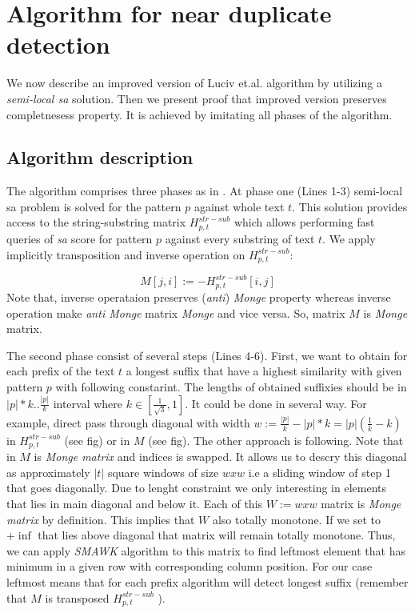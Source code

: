 \section{Algorithm for near duplicate detection}
\label{section:luciv}

We now describe an improved version of Luciv et.al. algorithm \cite{luciv2019interactive} by utilizing a \emph{semi-local sa} solution.
Then we present proof that improved version preserves completnesess property.
It is achieved by imitating all phases of the algorithm. 
 

\subsection{Algorithm description}

The algorithm comprises three phases as in \cite{luciv2019interactive}.
At phase one (Lines 1-3) semi-local sa problem is solved for the pattern $p$ against whole text $t$.
This solution provides access to the string-substring matrix $H^{str-sub}_{p,t}$ which allows performing fast queries of \emph{sa} score for pattern $p$ against every substring of text $t$.
We apply implicitly transposition and inverse operation on $H^{str-sub}_{p,t}$:

\begin{equation}
	M[j,i]:= -H^{str-sub}_{p,t}[i,j]
\end{equation}
Note that, inverse operataion preserves (\emph{anti}) \emph{Monge} property whereas inverse operation make \emph{anti Monge} matrix \emph{Monge} and vice versa. 
So, matrix $M$ is \emph{Monge} matrix.

The second phase consist of several steps (Lines 4-6).
First, we want to obtain for each prefix of the text $t$ a longest suffix that have a highest similarity with given pattern $p$ with following constarint.
The lengths of obtained suffixies should be in $|p|*k..\frac{|p|}{k}$ interval where $k \in [\frac{1}{\sqrt{3}},1]$.
It could be done in several way.
For example, direct pass through diagonal with width $w:= \frac{|p|}{k} - |p|*k = |p|(\frac{1}{k} - k)$ in $H^{str-sub}_{p,t}$ (see fig) or in $M$ (see fig).
The other approach is following.
Note that in  $M$ is \emph{Monge matrix} and  indices is swapped.
It allows us to descry this diagonal as approximately $|t|$ square windows of size $wxw$ i.e a sliding window of step 1 that goes diagonally.
Due to lenght constraint we only interesting in elements that lies in main diagonal and below it.
Each of this $W:=wxw$ matrix is \emph{Monge matrix} by definition.
This implies that $W$ also totally monotone.
If we set to $+\inf$ that lies above diagonal that matrix will remain totally monotone.
Thus, we can apply \emph{SMAWK} algorithm to this matrix to find leftmost element that has minimum in a given row with corresponding column position.
For our case leftmost means that for each prefix algorithm will detect longest suffix (remember that $M$ is transposed $H^{str-sub}_{p,t}$ ).

